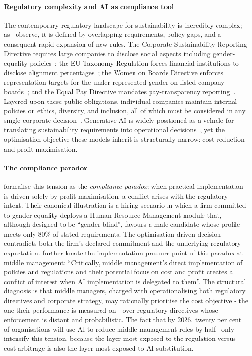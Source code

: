\documentclass[pdflatex, sn-apa]{sn-jnl}%
\theoremstyle{thmstyleone}%
\theoremstyle{thmstyletwo}%
\theoremstyle{thmstylethree}%
\begin{document}
\paragraph{Regulatory complexity and AI as compliance tool}
The contemporary regulatory landscape for sustainability is incredibly complex;
as~\citet{sargsyan2025legends} observe, it is defined by overlapping
requirements, policy gaps, and a consequent rapid expansion of new rules.
The Corporate Sustainability Reporting Directive requires large
companies to disclose social aspects including gender-equality
policies~\citep{europeancommission2022csrd}; the EU Taxonomy Regulation forces
financial institutions to disclose alignment
percentages~\citep{europeancommission2025taxonomy}; the Women on Boards
Directive enforces representation targets for the under-represented gender on
listed-company boards~\citep{europeanparliament2022wob}; and the Equal Pay
Directive mandates pay-transparency
reporting~\citep{europeancommission2025equalpay}. Layered upon these public
obligations, individual companies maintain internal policies on ethics,
diversity, and inclusion, all of which must be considered in any single
corporate decision~\citep{sargsyan2025legends}. Generative AI is widely
positioned as a vehicle for translating sustainability requirements into
operational decisions~\citep{storey2025genai}, yet the optimisation objective
these models inherit is structurally narrow: cost reduction and profit
maximisation.
 
\paragraph{The compliance paradox}
\citet{sargsyan2025legends} formalise this tension as the \emph{compliance
paradox}: when practical implementation is driven solely by profit maximisation,
a conflict arises with the regulatory intent. Their canonical illustration is a
hiring scenario in which a firm committed to gender equality deploys a
Human-Resource Management module that, although designed to be ``gender-blind'',
favours a male candidate whose profile meets only 80\% of stated requirements.
The optimisation-driven decision contradicts both the firm's declared commitment
and the underlying regulatory expectation. 
\citet{sargsyan2025legends} further locate the implementation pressure point of
this paradox at middle management: ``Critically, middle management's direct
implementation of policies and regulations and their potential focus on cost and
profit creates a conflict of interest when AI implementation is delegated to
them''. The structural diagnosis is that middle managers, charged with
operationalising both regulatory directives and corporate strategy, may
rationally prioritise the cost objective - the one their performance is measured
on - over regulatory directives whose enforcement is distant and probabilistic.
The fact that by 2026, twenty per cent of organisations will use AI to reduce
middle-management roles by half~\citep{economist2024gartner} only intensify this
tension, because the layer most exposed to the regulation-versus-cost arbitrage
is also the layer most exposed to AI substitution.
\end{document}
